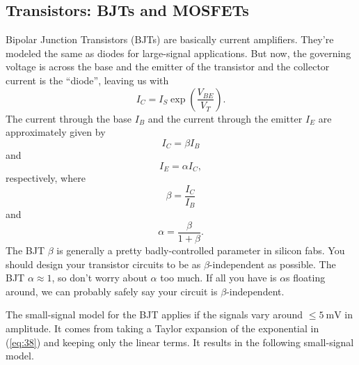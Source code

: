 \subsection{Transistors: BJTs and MOSFETs}
Bipolar Junction Transistors (BJTs) are basically current amplifiers. They're modeled the same as diodes for large-signal applications. But now, the governing voltage is across the base and the emitter of the transistor and the collector current is the ``diode'', leaving us with
\begin{equation}
\label{eq:38}
I_{C} = I_{S} \exp \left( \frac{V_{BE}}{V_{T}} \right).
\end{equation}
The current through the base $I_{B}$ and the current through the emitter $I_{E}$ are approximately given by
\begin{equation}
  \label{eq:39}
  I_{C} = \beta I_{B}
\end{equation}
and
\begin{equation}
  \label{eq:40}
  I_{E} = \alpha I_{C},
\end{equation}
respectively, where
\begin{equation}
\label{eq:41}
\beta = \frac{I_{C}}{I_{B}}
\end{equation}
and
\begin{equation}
\label{eq:42}
\alpha = \frac{ \beta }{ 1 + \beta }.
\end{equation}
The BJT $\beta$ is generally a pretty badly-controlled parameter in silicon fabs. You should design your transistor circuits to be as $\beta$-independent as possible. The BJT $\alpha \approx 1$, so don't worry about $\alpha$ too much. If all you have is $\alpha$s floating around, we can probably safely say your circuit is $\beta$-independent.

The small-signal model for the BJT applies if the signals vary around $\leq \SI{5}{\mV}$ in amplitude. It comes from taking a Taylor expansion of the exponential in (\ref{eq:38}) and keeping only the linear terms. It results in the following small-signal model. 

